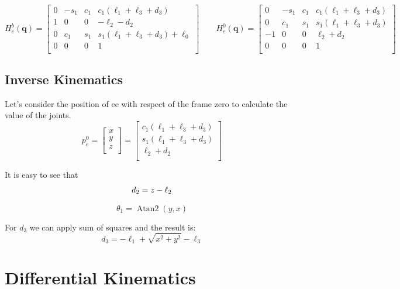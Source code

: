 \documentclass[a4paper,12pt]{article}
\renewcommand*{\t}{\theta}
\renewcommand*{\l}{\ell}
\newcommand*{\q}{\bm{q}}
\begin{document}
\[
H^b_e(\q) = \begin{bmatrix}
    0    &  - s_1 & c_1 & c_1(\l_1+\l_3+d_3)\\
    1   & 0      &  0  &  -\l_2 - d_2 \\
    0    & c_{1} & s_1 & s_1(\l_1+\l_3+d_3) + \l_0 \\
    0    &     0  & 0   &        1       \\
\end{bmatrix}
\qquad
H^0_e(\q) = \begin{bmatrix}
    0    &  - s_1 & c_1 & c_1(\l_1+\l_3+d_3)\\
    0    & c_{1} & s_1 & s_1(\l_1+\l_3+d_3)\\
    -1   & 0      &  0  &  \l_2 + d_2 \\
    0    &     0  & 0   &        1       \\
\end{bmatrix}
\]

\subsection{Inverse Kinematics}
Let's consider the position of ee with respect of the frame zero to calculate the value of the joints.
\[
p^0_e = \begin{bmatrix}
    x \\ y \\ z \\
\end{bmatrix}
=
\begin{bmatrix}
    c_1(\l_1+\l_3+d_3)\\
    s_1(\l_1+\l_3+d_3)\\
    \l_2 + d_2 \\
\end{bmatrix}
\]

It is easy to see that
\[
d_2 = z - \l_2 \\
\]

\[
\t_1 = \mathop{Atan2}(y, x)
\]


For $d_3$ we can apply sum of squares and the result is:
\[
  d_3 = -\l_1 + \sqrt{x^2+y^2} - \l_3  
\]

\section{Differential Kinematics}
\end{document}
